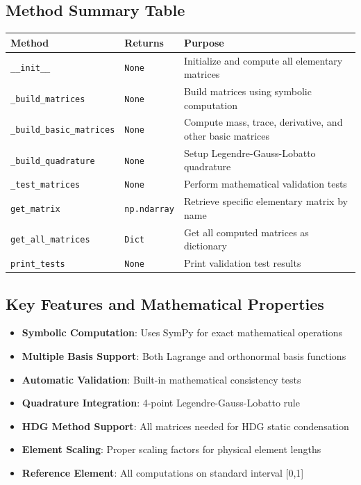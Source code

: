 \subsection{Method Summary Table}
\label{subsec:elementary_matrices_method_summary}

\begin{longtable}{|p{4.5cm}|p{2cm}|p{7cm}|}
\hline
\textbf{Method} & \textbf{Returns} & \textbf{Purpose} \\
\hline
\endhead

\texttt{\_\_init\_\_} & \texttt{None} & Initialize and compute all elementary matrices \\
\hline

\texttt{\_build\_matrices} & \texttt{None} & Build matrices using symbolic computation \\
\hline

\texttt{\_build\_basic\_matrices} & \texttt{None} & Compute mass, trace, derivative, and other basic matrices \\
\hline

\texttt{\_build\_quadrature} & \texttt{None} & Setup Legendre-Gauss-Lobatto quadrature \\
\hline

\texttt{\_test\_matrices} & \texttt{None} & Perform mathematical validation tests \\
\hline

\texttt{get\_matrix} & \texttt{np.ndarray} & Retrieve specific elementary matrix by name \\
\hline

\texttt{get\_all\_matrices} & \texttt{Dict} & Get all computed matrices as dictionary \\
\hline

\texttt{print\_tests} & \texttt{None} & Print validation test results \\
\hline

\end{longtable}

\subsection{Key Features and Mathematical Properties}

\begin{itemize}
    \item \textbf{Symbolic Computation}: Uses SymPy for exact mathematical operations
    \item \textbf{Multiple Basis Support}: Both Lagrange and orthonormal basis functions
    \item \textbf{Automatic Validation}: Built-in mathematical consistency tests
    \item \textbf{Quadrature Integration}: 4-point Legendre-Gauss-Lobatto rule
    \item \textbf{HDG Method Support}: All matrices needed for HDG static condensation
    \item \textbf{Element Scaling}: Proper scaling factors for physical element lengths
    \item \textbf{Reference Element}: All computations on standard interval [0,1]
\end{itemize}


